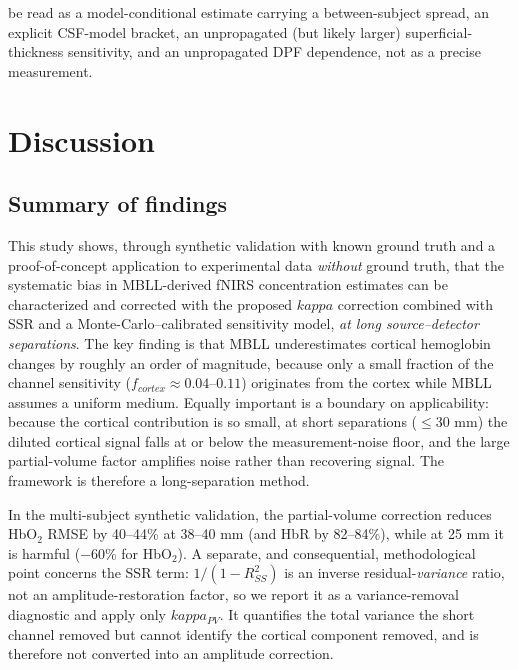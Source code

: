 \documentclass[11pt]{article}
\def\kappa{kappa}%
\def\mathrm#1{#1}%
\def\,{ }%
\begin{document}
be read as a model-conditional estimate carrying a between-subject spread, an explicit CSF-model bracket, an unpropagated (but likely larger) superficial-thickness sensitivity, and an unpropagated DPF dependence, not as a precise measurement.

\section{Discussion}

\subsection{Summary of findings}

This study shows, through synthetic validation with known ground truth and a proof-of-concept application to experimental data \emph{without} ground truth, that the systematic bias in MBLL-derived fNIRS concentration estimates can be characterized and corrected with the proposed $\kappa$ correction combined with SSR and a Monte-Carlo--calibrated sensitivity model, \emph{at long source--detector separations}. The key finding is that MBLL underestimates cortical hemoglobin changes by roughly an order of magnitude, because only a small fraction of the channel sensitivity ($f_{\mathrm{cortex}}\approx0.04$--$0.11$) originates from the cortex while MBLL assumes a uniform medium. Equally important is a boundary on applicability: because the cortical contribution is so small, at short separations ($\leq$30\,mm) the diluted cortical signal falls at or below the measurement-noise floor, and the large partial-volume factor amplifies noise rather than recovering signal. The framework is therefore a long-separation method.

In the multi-subject synthetic validation, the partial-volume correction reduces HbO$_2$ RMSE by 40--44\% at 38--40\,mm (and HbR by 82--84\%), while at 25\,mm it is harmful ($-$60\% for HbO$_2$). A separate, and consequential, methodological point concerns the SSR term: $1/(1-R^2_{\mathrm{SS}})$ is an inverse residual-\emph{variance} ratio, not an amplitude-restoration factor, so we report it as a variance-removal diagnostic and apply only $\kappa_{\mathrm{PV}}$. It quantifies the total variance the short channel removed but cannot identify the cortical component removed, and is therefore not converted into an amplitude correction.
\end{document}
